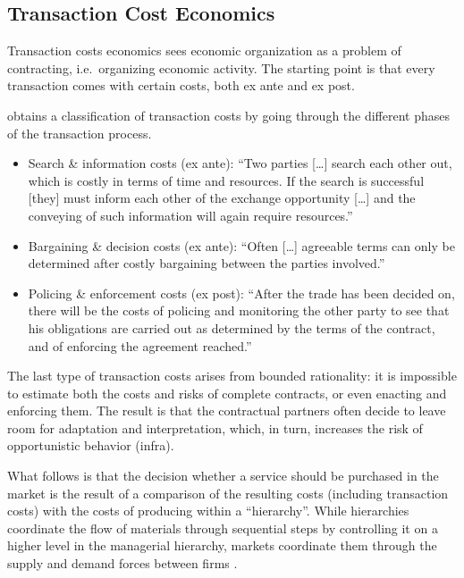 \documentclass[12pt]{article}
\begin{document}
\subsection{Transaction Cost
Economics}\label{transaction-cost-economics}

Transaction costs economics sees economic organization as a problem of
contracting, i.e.~organizing economic activity. The starting point is
that every transaction comes with certain costs, both ex ante and ex
post.

\citet[147-148]{dahlman1979} obtains a classification of transaction
costs by going through the different phases of the transaction process.

\begin{itemize}
\item
  Search \& information costs (ex ante): ``Two parties {[}\ldots{]}
  search each other out, which is costly in terms of time and resources.
  If the search is successful {[}they{]} must inform each other of the
  exchange opportunity {[}\ldots{]} and the conveying of such
  information will again require resources.''
\item
  Bargaining \& decision costs (ex ante): ``Often {[}\ldots{]} agreeable
  terms can only be determined after costly bargaining between the
  parties involved.''
\item
  Policing \& enforcement costs (ex post): ``After the trade has been
  decided on, there will be the costs of policing and monitoring the
  other party to see that his obligations are carried out as determined
  by the terms of the contract, and of enforcing the agreement
  reached.''
\end{itemize}

The last type of transaction costs arises from bounded rationality: it
is impossible to estimate both the costs and risks of complete
contracts, or even enacting and enforcing them. \citep[ 53]{aubert1996}
The result is that the contractual partners often decide to leave room
for adaptation and interpretation, which, in turn, increases the risk of
opportunistic behavior (infra).

What follows is that the decision whether a service should be purchased
in the market is the result of a comparison of the resulting costs
(including transaction costs) with the costs of producing within a
``hierarchy''. While hierarchies coordinate the flow of materials
through sequential steps by controlling it on a higher level in the
managerial hierarchy, markets coordinate them through the supply and
demand forces between firms \citep[ 485]{malone1987}.
\end{document}
